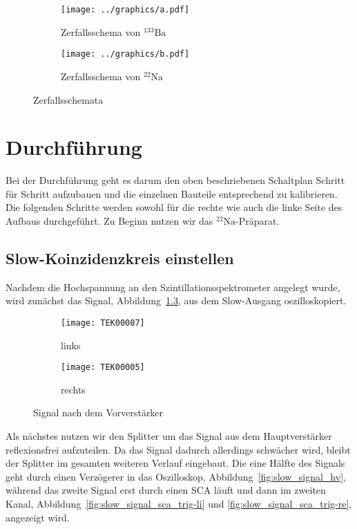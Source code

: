 \documentclass[11pt, ngerman, fleqn, DIV=15, headinclude, BCOR=2cm]{scrreprt}
\begin{document}
\begin{figure}
	\centering
	\begin{subfigure}{0.49 \textwidth}
		\texttt{[image: ../graphics/a.pdf]}
		\caption{%
                    Zerfallsschema von $^{133}\text{Ba}$
		}
		\label{fig:barium}
	\end{subfigure}
	\begin{subfigure}{0.49 \textwidth}
		\texttt{[image: ../graphics/b.pdf]}
		\caption{%
                    Zerfallsschema von $^{22}\text{Na}$
		}
		\label{fig:natrium}
	\end{subfigure}
	\caption{%
		Zerfallsschemata
	}
	\label{fig:zerfallsschema}
\end{figure}


\chapter{Durchführung}


Bei der Durchführung geht es darum den oben beschriebenen Schaltplan Schritt
für Schritt aufzubauen und die einzelnen Bauteile entsprechend zu
kalibrieren. Die folgenden Schritte werden sowohl für die rechte wie auch die
linke Seite des Aufbaus durchgeführt. Zu Beginn nutzen wir das
$^{22}\text{Na}$-Präparat. 

\section{Slow-Koinzidenzkreis einstellen}
Nachdem die Hochspannung an den Szintillationsspektrometer angelegt wurde, wird
zunächst das Signal, Abbildung~\ref{fig:slow_signal}, aus dem Slow-Ausgang oszilloskopiert.

\begin{figure}[htbp]
	\centering
	\begin{subfigure}{0.49 \textwidth}
		\texttt{[image: TEK00007]}
		\caption{%
			links
		}
		\label{fig:slow_signal-li}
	\end{subfigure}
	\begin{subfigure}{0.49 \textwidth}
		\texttt{[image: TEK00005]}
		\caption{%
			rechts
		}
		\label{fig:slow_signal-re}
	\end{subfigure}
	\caption{%
		Signal nach dem Vorverstärker
	}
	\label{fig:slow_signal}
\end{figure}

Als nächstes nutzen wir den Splitter um das Signal aus dem Hauptverstärker
reflexionsfrei aufzuteilen. Da das Signal dadurch allerdings schwächer wird,
bleibt der Splitter im gesamten weiteren Verlauf eingebaut. Die eine Hälfte des
Signals geht durch einen Verzögerer in das Oszilloskop, Abbildung~\ref{fig:slow_signal_hv}, während das zweite Signal erst
durch einen SCA läuft und dann im zweiten Kanal,
Abbildung~\ref{fig:slow_signal_sca_trig-li} und
\ref{fig:slow_signal_sca_trig-re}, angezeigt wird.
\end{document}
